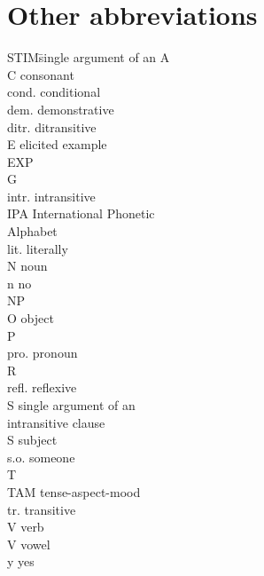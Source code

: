 \section*{Other abbreviations}
	\begin{multicols}{2}
		\begin{tabbing}
		  STIM\hspace{\tabcolsep}\= single argument of an\kill
			A 		\>	\isi{agent}\\
			C		\>  consonant\\
			cond.	\>	conditional\\
			dem.	\>	demonstrative\\
			ditr.	\>	ditransitive\\
			E	\>	elicited example\\
			EXP 	\>	\\
			G 		\>	\\
			intr. 	\>	intransitive\\
			IPA 	\>	International Phonetic\\
			{}		\>	Alphabet\\
			lit. 	\>	literally\\
			N 		\>	noun\\
			n		\>	no\\
			NP 		\>	\\
			O		\>	object\\
			P 		\>	\\
			pro.		\>	pronoun\\
			R 		\>	\\
			refl.		\>	reflexive\\
			S 		\>	single argument of an\\
			{}		\>	intransitive clause\\
			S		\>	subject\\
			s.o.		\>	someone\\
			T 		\>	\isi{theme}\\
			TAM 	\>	tense-aspect-mood\\
			tr. 	\>	transitive\\
			V 		\>	verb\\
			V		\> 	vowel\\
			y		\> 	yes\\
		\end{tabbing}
	\end{multicols}
